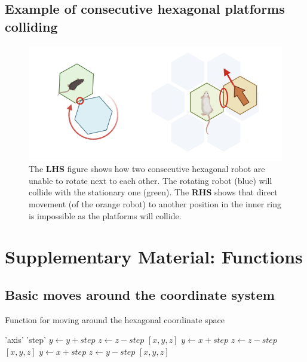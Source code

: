 \subsection{Example of consecutive hexagonal platforms colliding}
\label{fig:collision}
\begin{figure}[H]
    \centering
    \includegraphics[scale= 0.8]{images/collisions.png}
    \caption{The \textbf{LHS} figure shows how two consecutive hexagonal robot are unable to rotate next to each other. The rotating robot (blue) will collide with the stationary one (green). The \textbf{RHS} shows that direct movement (of the orange robot) to another position in the inner ring is impossible as the platforms will collide.}

\end{figure}

\newpage
\section{Supplementary Material: Functions}

\subsection{Basic moves around the coordinate system}
\label{function:move_around_hex_grid}
\begin{algorithm}
\caption{Function for moving around the hexagonal coordinate space}
 \begin{algorithmic}
 \REQUIRE 'axis' \AND 'step'
        \STATE$y \leftarrow y + step$
        \STATE$z \leftarrow z - step$
        \RETURN $[x, y, z]$
        \STATE$y \leftarrow x + step$
        \STATE$z \leftarrow z - step$
        \RETURN $[x, y, z]$
        \STATE$y \leftarrow x + step$
        \STATE$z \leftarrow y - step$
        \RETURN $[x, y, z]$
   \ENDIF
   
\end{algorithmic}
\end{algorithm}

